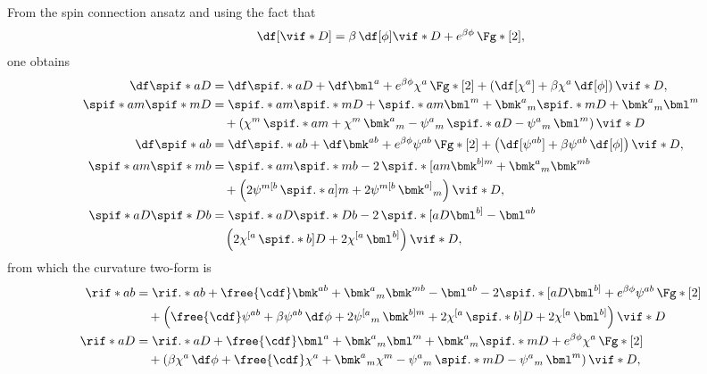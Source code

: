 From the spin connection ansatz and using the fact that
\begin{equation}
  \df[\vif*{D}] = \beta \, \df[\phi] \vif*{D} + e^{\beta \phi} \, \Fg*[2],
\end{equation}
one obtains
\begin{align}
  \df \spif*{a D}{}
  &= \df \spif.*{a D}{} + \df \bml^a + e^{\beta \phi} \chi^a \, \Fg*[2] + \left( \df[\chi^a] + \beta \chi^a \, \df[\phi] \right) \vif*{D}, \\
  \spif*{a}{m}  \spif*{m D}{}
  &= \spif.*{a}{m} \spif.*{m D}{} + \spif.*{a}{m} \bml^m + \bmk^a{}_m \spif.*{m D}{} + \bmk^{a}{}_m \bml^m \\
  & \quad + \left( \chi^m \, \spif.*{a}{m} + \chi^m \, \bmk^a{}_m - \psi^a{}_m  \, \spif.*{a}{D} - \psi^a{}_m  \, \bml^m \right) \vif*{D} \notag \\
  \df \spif*{a b}{}
  &= \df \spif.*{a b}{} + \df \bmk^{ab} + e^{\beta \phi} \psi^{ab} \, \Fg*[2] + \left( \df[\psi^{ab}] + \beta \psi^{ab} \, \df[\phi] \right) \vif*{D} ,\\
  \spif*{a}{m} \spif*{m}{b}
  &= \spif.*{a}{m} \spif.*{m}{b} - 2 \, \spif.*{[a}{m} \bmk^{b]m} + \bmk^a{}_m \bmk^{mb} \\
  & \quad + \left( 2 \psi^{m[b} \, \spif.*{a]}{m} + 2 \psi^{m[b} \, \bmk^{a]}{}_{m} \right) \vif*{D}, \notag \\
  \spif*{a}{D} \spif*{D}{b}
  &= \spif.*{a}{D} \spif.*{D}{b} - 2 \, \spif.*{[a}{D} \bml^{b]} - \bml^{ab} \\
  & \quad \left( 2 \chi^{[a} \, \spif.*{b]}{D} + 2 \chi^{[a} \, \bml^{b]} \right) \vif*{D}, \notag
\end{align}
from which the curvature two-form is
\begin{align}
  \rif*{a b}{} &= \rif.*{a b}{} + \free{\cdf}\bmk^{ab} + \bmk^a{}_m \bmk^{mb} - \bml^{ab} - 2 \spif.*{[a}{D} \bml^{b]} + e^{\beta \phi} \psi^{ab} \, \Fg*[2] \label{Rwtab} \\
  & \quad + \left( \free{\cdf}\psi^{ab} + \beta \psi^{ab} \, \df \phi + 2 \psi^{[a}{}_m \, \bmk^{b] m} + 2 \chi^{[a} \, \spif.*{b] D}{} + 2 \chi^{[a} \, \bml^{b]} \right) \vif*{D}  \notag \\
  \rif*{a D}{} &= \rif.*{a D}{} + \free{\cdf} \bml^a + \bmk^{a}{}_m \bml^m + \bmk^{a}{}_m \spif.*{m D}{} + e^{\beta \phi} \chi^a \, \Fg*[2] \label{Rwtad} \\
  & \quad + \left( \beta \chi^a \, \df\phi + \free{\cdf} \chi^a + \bmk^a{}_m \chi^m - \psi^a{}_m \, \spif.*{m D}{} - \psi^a{}_m \, \bml^m \right) \vif*{D}, \notag 
\end{align}

